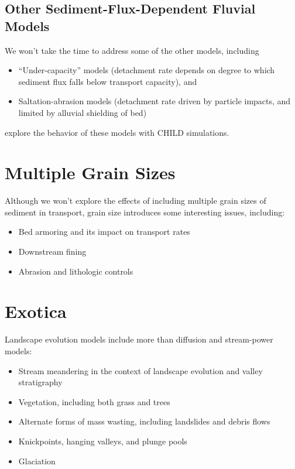 \documentclass[12pt,reqno]{amsart}
\begin{document}
\subsection{Other Sediment-Flux-Dependent Fluvial Models}

We won't take the time to address some of the other models, including
\begin{itemize}
\item ``Under-capacity'' models (detachment rate depends on degree to
  which sediment flux falls below transport capacity), and
\item Saltation-abrasion models (detachment rate driven by particle impacts, and limited by alluvial shielding of bed)
\end{itemize}

\citet{gasparini2007predictions} explore the behavior of these models with CHILD simulations.

\section{Multiple Grain Sizes}

Although we won't explore the effects of including multiple grain
sizes of sediment in transport, grain size introduces some interesting issues, including:
\begin{itemize}
\item Bed armoring and its impact on transport rates
\item Downstream fining
\item Abrasion and lithologic controls
\end{itemize}

\section{Exotica}

Landscape evolution models include more than diffusion and
stream-power models:
\begin{itemize}
\item Stream meandering in the context of landscape evolution and valley stratigraphy \citep{clevis2006simple,clevis2006geoarchaeological}
\item Vegetation, including both grass
  \citep{collins2004modeling,istanbulluoglu2005vegetation} and trees
  \citep{lancaster2003effects}
\item Alternate forms of mass wasting, including landslides and debris
  flows \citep{densmore1998landsliding,lancaster2003effects,istanbulluoglu2005implications}
\item Knickpoints, hanging valleys, and plunge pools \citep{flores2006development,crosby2007formation}
\item Glaciation \citep{herman2006fluvial,herman2007tectonomorphic,herman2008evolution}
\end{itemize}
\end{document}
